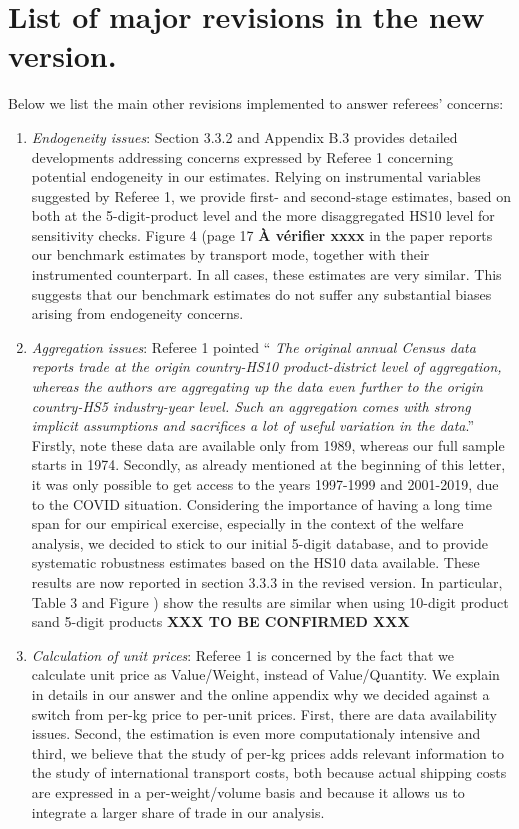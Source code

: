 \documentclass[12pt]{article}
\begin{document}
\section{List of major revisions in the new version.}

Below we list the main other revisions implemented to answer referees' concerns:

\begin{enumerate}


\item \emph{Endogeneity issues}: Section 3.3.2 and Appendix B.3 provides detailed developments addressing concerns expressed by Referee 1 concerning potential endogeneity in our estimates. Relying on instrumental variables suggested by Referee 1, we provide first- and second-stage estimates, based on both at the 5-digit-product level and the more disaggregated HS10 level for sensitivity checks. Figure 4 (page 17 \textbf{À vérifier xxxx} in the paper reports our benchmark estimates by transport mode, together with their instrumented counterpart. In all cases, these estimates are very similar. This suggests that our benchmark estimates do not suffer any substantial biases arising from endogeneity concerns.
    
\item \emph{Aggregation issues}: Referee 1 pointed `` \emph{The original annual Census data reports trade at the origin country-HS10 product-district level of aggregation, whereas the authors are aggregating up the data even further to the origin country-HS5 industry-year level. Such an aggregation comes with strong implicit assumptions and sacrifices a lot of useful variation in the data}.'' Firstly, note these data are available only from 1989, whereas our full sample starts in 1974. Secondly, as already mentioned at the beginning of this letter, it was only possible to get access to the years 1997-1999 and 2001-2019, due to the COVID situation. Considering the importance of having a long time span for our empirical exercise, especially in the context of the welfare analysis, we decided to stick to our initial 5-digit database, and to provide systematic robustness estimates based on the HS10 data available. These results are now reported in section 3.3.3 in the revised version. In particular, Table 3 and Figure ) show the results are similar when using 10-digit product sand 5-digit products \textbf{XXX TO BE CONFIRMED XXX}
    
\item \emph{Calculation of unit prices}: Referee 1 is concerned by the fact that we calculate unit price as Value/Weight, instead of Value/Quantity. We explain in details in our answer and the online appendix why we decided against a switch from per-kg price to per-unit prices. First, there are data availability issues. Second, the estimation is even more computationaly intensive and third, we believe that the study of per-kg prices adds relevant information to the study of international transport costs, both because actual shipping costs are expressed in a per-weight/volume basis and because it allows us to integrate a larger share of trade in our analysis.

\end{enumerate}
\end{document}
